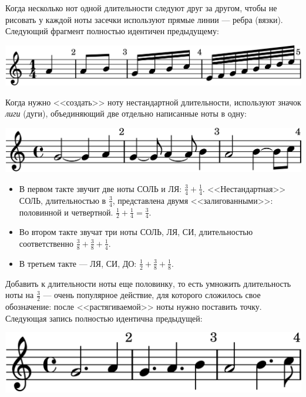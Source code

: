 Когда несколько нот одной длительности следуют друг за другом, чтобы не рисовать у каждой ноты засечки используют прямые линии --- ребра (вязки). Следующий фрагмент полностью идентичен предыдущему:
\begin{center}    
    \includegraphics{fig/notes/time-1-4-beam-on}
\end{center}

Когда нужно <<создать>> ноту нестандартной длительности, используют значок \emph{лиги} (дуги), объединяющий две отдельно написанные ноты в одну:
\begin{center}    
    \includegraphics{fig/notes/tie}
\end{center}

\begin{itemize}
    \item В первом такте звучит две ноты СОЛЬ и ЛЯ: $\frac{3}{4} + \frac{1}{4}$. <<Нестандартная>> СОЛЬ, длительностью в $\frac{3}{4}$, представлена двумя <<залигованными>>: половинной и четвертной. $\frac{1}{2}+\frac{1}{4} = \frac{3}{4}$.
    
    \item Во втором такте звучат три ноты СОЛЬ, ЛЯ, СИ, длительностью соответственно $\frac{3}{8} + \frac{3}{8} + \frac{1}{4}$.
    
    \item В третьем такте --- ЛЯ, СИ, ДО: $\frac{1}{2} + \frac{3}{8} + \frac{1}{8}$. 
\end{itemize}

Добавить к длительности ноты еще половинку, то есть умножить длительность ноты на $\frac{3}{2}$ --- очень популярное действие, для которого сложилось свое обозначение: после <<растягиваемой>> ноты нужно поставить точку. Следующая запись полностью идентична предыдущей:
\begin{center}    
    \includegraphics{fig/notes/point}
\end{center}

